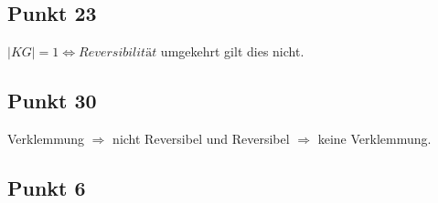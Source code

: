 \documentclass[10pt]{scrartcl}
\begin{document}
				\subsection{Punkt 23}
				$|KG| = 1 \Longleftrightarrow \textit{Reversibilität}$ umgekehrt gilt dies nicht.
				
				
				\subsection{Punkt 30}
				Verklemmung $\Longrightarrow$ nicht Reversibel und Reversibel $\Longrightarrow$ keine Verklemmung.	
			
				\subsection{Punkt 6}
						
				
			
\end{document}
